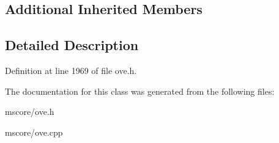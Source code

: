 \subsection*{Additional Inherited Members}


\subsection{Detailed Description}


Definition at line 1969 of file ove.\+h.



The documentation for this class was generated from the following files\+:\begin{DoxyCompactItemize}
\item 
mscore/ove.\+h\item 
mscore/ove.\+cpp\end{DoxyCompactItemize}
